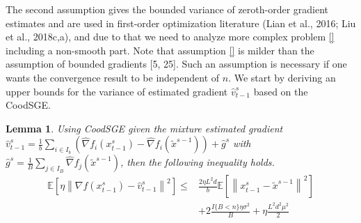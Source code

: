 \documentclass{article}
\newcommand*{\E}{\mathbb{E}}
\newcommand{\norm}[1]{\left\lVert#1\right\rVert}
\newtheorem{lemma}[theorem]{Lemma}
\theoremstyle{definition}
\theoremstyle{remark}
\begin{document}
{\color{Green} The second assumption gives the bounded variance of zeroth-order gradient estimates and are used in first-order optimization literature (Lian et al., 2016; Liu et al., 2018c,a), and due to that we need to analyze more complex problem \eqref{} including a non-smooth part. {\color{Brown}
Note that assumption \ref{} is milder than the assumption of bounded gradients [5, 25].} {\color{Violet}Such an assumption is necessary if one wants the convergence result to be independent of $n$.
}
{\color{Green}
We start by deriving an upper bounds for the variance of estimated gradient $\hat{v}_{t-1}^s$ based on the CoodSGE.}
}
\begin{lemma}\label{var-estimate-lem}
Using CoodSGE given the mixture estimated gradient $\hat{v}_{t-1}^s = \frac{1}{b} \sum_{i\in I_b}\left(\hat{\nabla} f_{i}(x_{t-1}^s)-\hat{\nabla} f_{i}(\tilde{x}^{s-1})\right)+\hat{g}^s$ with $\hat{g}^s = \frac{1}{B} \sum_{j\in I_B} \hat{\nabla} f_j (\widetilde{x}^{s-1})$, then the following inequality holds. 
\begin{equation}
\begin{split}
\E\left[\eta\norm{\nabla f(x_{t-1}^s)-{\hat{v}_{t-1}^s}}^2\right] \leq&  \frac{2\eta L^2 d}{b}\E\left[\norm{x_{t-1}^s-\widetilde{x}^{s-1}}^2\right]\\
&+ 2\frac{I\{B < n\}\eta \sigma ^2}{B}+\eta \frac{L^2 d^2 \mu^2}{2}
\end{split}
\end{equation}
\end{lemma}
\end{document}
